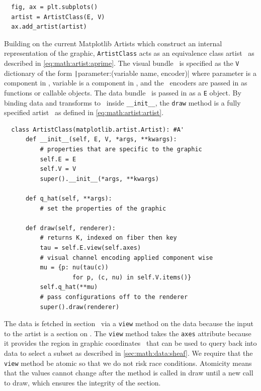 \documentclass[../main.tex]{subfiles}
\begin{document}
\begin{verbatim}
  fig, ax = plt.subplots()
  artist = ArtistClass(E, V)
  ax.add_artist(artist)
\end{verbatim}
Building on the current Matplotlib Artists which construct an internal representation of the graphic, \texttt{ArtistClass} acts as an equivalence class artist \vartisteq\ as described in \autoref{eq:math:artist:aprime}. The visual bundle \vtotal\ is specified as the \texttt{V} dictionary of the form \texttt|{parameter:(variable name, encoder)}| where parameter is a component in \vfiber, variable is a component in \dfiber, and the \vchannel\ encoders are passed in as functions or callable objects. The data bundle \dtotal\ is passed in as a \texttt{E} object. By binding data and transforms to \vartisteq\ inside \texttt{__init__}, the \texttt{draw} method is a fully specified artist \vartist\ as defined in \autoref{eq:math:artist:artist}.
\begin{verbatim}
  class ArtistClass(matplotlib.artist.Artist): #A'
      def __init__(self, E, V, *args, **kwargs):
          # properties that are specific to the graphic
          self.E = E
          self.V = V 
          super().__init__(*args, **kwargs)
  
      def q_hat(self, **args): 
          # set the properties of the graphic
  
      def draw(self, renderer):
          # returns K, indexed on fiber then key 
          tau = self.E.view(self.axes) 
          # visual channel encoding applied component wise 
          mu = {p: nu(tau(c))
                   for p, (c, nu) in self.V.items()} 
          self.q_hat(**mu)
          # pass configurations off to the renderer
          super().draw(renderer)
  \end{verbatim}
 The data is fetched in section \dsection\ via a \texttt{view} method on the data because the input to the artist is a section on \dtotal. The \texttt{view} method takes the \texttt{axes} attribute because it provides the region in graphic coordinates \gbase\ that can be used to query back into data to select a subset as described in \autoref{sec:math:data:sheaf}. We require that the \texttt{view} method be atomic so that we do not risk race conditions. Atomicity means that the values cannot change after the method is called in draw until a new call to draw\cite{ullmanFirstCourseDatabase2008}, which ensures the integrity of the section.
 
\end{document}
